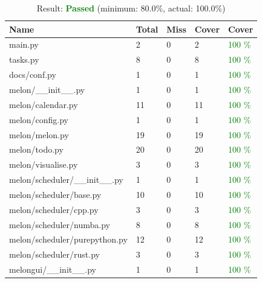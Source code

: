 \documentclass{prettytex/ox/mmsc-special-topic}
\begin{document}
  \begin{table}[H]
    \centering
    \caption{Result: \textcolor{green}{\bf Passed} (minimum: 80.0\%, actual: 100.0\%)}
    \begin{tabular}{lllll}
      \hline
      \bf Name                        & \bf Total & \bf Miss & \bf Cover & \bf Cover                 \\
      \hline
      main.py                         & 2         & 0        & 2         & \textcolor{green}{100 \%} \\
      tasks.py                        & 8         & 0        & 8         & \textcolor{green}{100 \%} \\
      docs/conf.py                    & 1         & 0        & 1         & \textcolor{green}{100 \%} \\
      melon/\_\_init\_\_.py           & 1         & 0        & 1         & \textcolor{green}{100 \%} \\
      melon/calendar.py               & 11        & 0        & 11        & \textcolor{green}{100 \%} \\
      melon/config.py                 & 1         & 0        & 1         & \textcolor{green}{100 \%} \\
      melon/melon.py                  & 19        & 0        & 19        & \textcolor{green}{100 \%} \\
      melon/todo.py                   & 20        & 0        & 20        & \textcolor{green}{100 \%} \\
      melon/visualise.py              & 3         & 0        & 3         & \textcolor{green}{100 \%} \\
      melon/scheduler/\_\_init\_\_.py & 1         & 0        & 1         & \textcolor{green}{100 \%} \\
      melon/scheduler/base.py         & 10        & 0        & 10        & \textcolor{green}{100 \%} \\
      melon/scheduler/cpp.py          & 3         & 0        & 3         & \textcolor{green}{100 \%} \\
      melon/scheduler/numba.py        & 8         & 0        & 8         & \textcolor{green}{100 \%} \\
      melon/scheduler/purepython.py   & 12        & 0        & 12        & \textcolor{green}{100 \%} \\
      melon/scheduler/rust.py         & 3         & 0        & 3         & \textcolor{green}{100 \%} \\
      melongui/\_\_init\_\_.py        & 1         & 0        & 1         & \textcolor{green}{100 \%} \\

\end{tabular}
\end{table}
\end{document}
